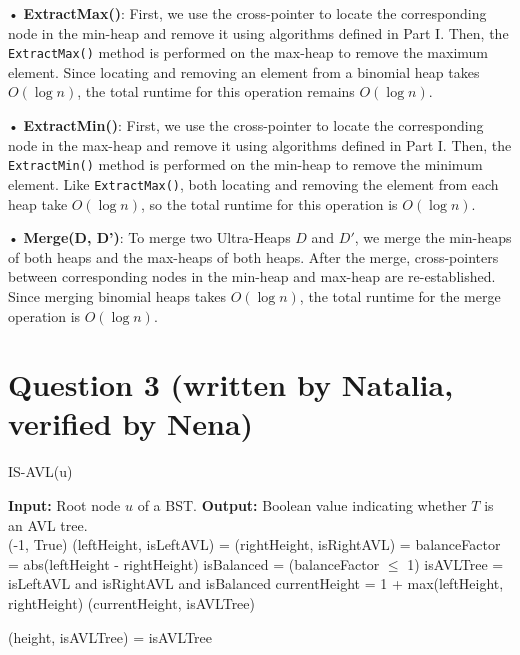 \documentclass[11pt, a4paper]{article}
\begin{document}
• \textbf{ExtractMax()}: First, we use the cross-pointer to locate the corresponding node in the min-heap and remove it using algorithms defined in Part I. Then, the \texttt{ExtractMax()} method is performed on the max-heap to remove the maximum element. Since locating and removing an element from a binomial heap takes \(O(\log n)\), the total runtime for this operation remains \(O(\log n)\).

• \textbf{ExtractMin()}: First, we use the cross-pointer to locate the corresponding node in the max-heap and remove it using algorithms defined in Part I. Then, the \texttt{ExtractMin()} method is performed on the min-heap to remove the minimum element. Like \texttt{ExtractMax()}, both locating and removing the element from each heap take \(O(\log n)\), so the total runtime for this operation is \(O(\log n)\).

• \textbf{Merge(D, D')}: To merge two Ultra-Heaps \(D\) and \(D'\), we merge the min-heaps of both heaps and the max-heaps of both heaps. After the merge, cross-pointers between corresponding nodes in the min-heap and max-heap are re-established. Since merging binomial heaps takes \(O(\log n)\), the total runtime for the merge operation is \(O(\log n)\).



\section*{Question 3 (written by Natalia, verified by Nena)}

\begin{algorithm} [H]
\caption{IS-AVL(u)}
\begin{algorithmic}[1]
\State \textbf{Input:} Root node \(u\) of a BST.
\State \textbf{Output:} Boolean value indicating whether \(T\) is an AVL tree.
\\
        \State \Return (-1, True)
    \EndIf
    \State (leftHeight, isLeftAVL) = 
    \State (rightHeight, isRightAVL) = 
    \State balanceFactor = abs(leftHeight - rightHeight)
    \State isBalanced = (balanceFactor $\leq$ 1)
    \State isAVLTree = isLeftAVL and isRightAVL and isBalanced
    \State currentHeight = 1 + max(leftHeight, rightHeight)
    \State \Return (currentHeight, isAVLTree)
\EndFunction

    \State (height, isAVLTree) = 
    \State \Return isAVLTree
\EndFunction

\end{algorithmic}
\end{algorithm}
\end{document}
